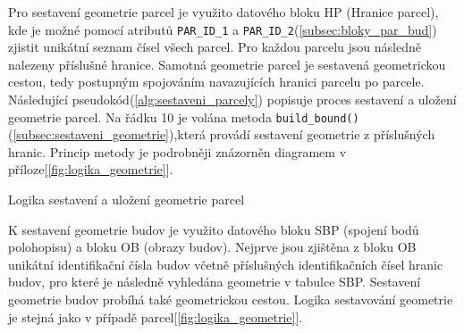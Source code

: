 Pro sestavení geometrie parcel je využito datového bloku HP (Hranice
parcel), kde je možné pomocí atributů \verb|PAR_ID_1| a
\verb|PAR_ID_2|(\ref{subsec:bloky_par_bud}) zjistit unikátní seznam
čísel všech parcel. Pro každou parcelu jsou následně nalezeny
příslušné hranice. Samotná geometrie parcel je sestavená geometrickou
cestou, tedy postupným spojováním navazujících hranici parcelu po
parcele. Následující pseudokód(\ref{alg:sestaveni_parcely}) popisuje
proces sestavení a uložení geometrie parcel. Na řádku 10 je volána
metoda \verb|build_bound()|(\ref{subsec:sestaveni_geometrie}),která
provádí sestavení geometrie z příslušných hranic. Princip metody je
podrobněji znázorněn diagramem v příloze[\ref{fig:logika_geometrie}].

\begin{algorithm}
\caption{Logika sestavení a uložení geometrie parcel}
\label{alg:sestaveni_parcely}
	\begin{algorithmic}[1]
		\ENDFOR
		\ELSE
		\ENDIF
	\ENDFOR
	\end{algorithmic}
\end{algorithm}

K sestavení geometrie budov je využito datového bloku SBP (spojení
bodů polohopisu) a bloku OB (obrazy budov). Nejprve jsou zjištěna z
bloku OB unikátní identifikační čísla budov včetně příslušných
identifikačních čísel hranic budov, pro které je následně vyhledána
geometrie v tabulce SBP. Sestavení geometrie budov probíhá také
geometrickou cestou. Logika sestavování geometrie je stejná jako v
případě parcel[\ref{fig:logika_geometrie}].

